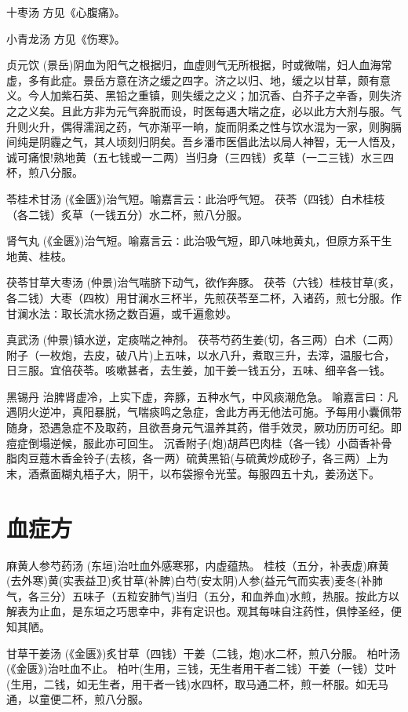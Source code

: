 \documentclass[a4paper,12pt,UTF8,twoside]{ctexbook}
\begin{document}
	十枣汤
	方见《心腹痛》。
	
	小青龙汤
	方见《伤寒》。
	
	贞元饮
	(景岳)阴血为阳气之根据归，血虚则气无所根据，时或微喘，妇人血海常虚，多有此症。景岳方意在济之缓之四字。济之以归、地，缓之以甘草，颇有意义。今人加紫石英、黑铅之重镇，则失缓之之义；加沉香、白芥子之辛香，则失济之之义矣。且此方非为元气奔脱而设，时医每遇大喘之症，必以此方大剂与服。气升则火升，偶得濡润之药，气亦渐平一晌，旋而阴柔之性与饮水混为一家，则胸膈间纯是阴霾之气，其人顷刻归阴矣。吾乡潘市医倡此法以局人神智，无一人悟及，诚可痛恨!熟地黄（五七钱或一二两）当归身（三四钱）炙草（一二三钱）水三四杯，煎八分服。
	
	苓桂术甘汤
	(《金匮》)治气短。喻嘉言云∶此治呼气短。
	茯苓（四钱）白术桂枝（各二钱）炙草（一钱五分）水二杯，煎八分服。
	
	肾气丸
	(《金匮》)治气短。喻嘉言云∶此治吸气短，即八味地黄丸，但原方系干生地黄、桂枝。
	
	茯苓甘草大枣汤
	(仲景)治气喘脐下动气，欲作奔豚。
	茯苓（六钱）桂枝甘草(炙，各二钱）大枣（四枚）用甘澜水三杯半，先煎茯苓至二杯，入诸药，煎七分服。作甘澜水法∶取长流水扬之数百遍，或千遍愈妙。
	
	真武汤
	(仲景)镇水逆，定痰喘之神剂。
	茯苓芍药生姜(切，各三两）白术（二两）附子（一枚炮，去皮，破八片)上五味，以水八升，煮取三升，去滓，温服七合，日三服。宜倍茯苓。咳嗽甚者，去生姜，加干姜一钱五分，五味、细辛各一钱。
	
	黑锡丹
	治脾肾虚冷，上实下虚，奔豚，五种水气，中风痰潮危急。
	喻嘉言曰∶凡遇阴火逆冲，真阳暴脱，气喘痰鸣之急症，舍此方再无他法可施。予每用小囊佩带随身，恐遇急症不及取药，且欲吾身元气温养其药，借手效灵，厥功历历可纪。即痘症倒塌逆候，服此亦可回生。
	沉香附子(炮)胡芦巴肉桂（各一钱）小茴香补骨脂肉豆蔻木香金铃子(去核，各一两）硫黄黑铅(与硫黄炒成砂子，各三两）上为末，酒煮面糊丸梧子大，阴干，以布袋擦令光莹。每服四五十丸，姜汤送下。
	
	\chapter{血症方}
	 麻黄人参芍药汤
	(东垣)治吐血外感寒邪，内虚蕴热。
	桂枝（五分，补表虚)麻黄(去外寒)黄(实表益卫)炙甘草(补脾)白芍(安太阴)人参(益元气而实表)麦冬(补肺气，各三分）五味子（五粒安肺气)当归（五分，和血养血)水煎，热服。按此方以解表为止血，是东垣之巧思幸中，非有定识也。观其每味自注药性，俱悖圣经，便知其陋。
	
	甘草干姜汤
	(《金匮》)炙甘草（四钱）干姜（二钱，炮)水二杯，煎八分服。
	柏叶汤(《金匮》)治吐血不止。
	柏叶(生用，三钱，无生者用干者二钱）干姜（一钱）艾叶(生用，二钱，如无生者，用干者一钱)水四杯，取马通二杯，煎一杯服。如无马通，以童便二杯，煎八分服。
	
\end{document}
